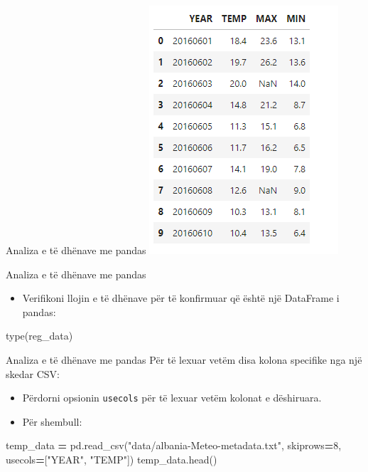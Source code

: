 \documentclass[
  ignorenonframetext,
]{beamer}
\newenvironment{Shaded}{\begin{snugshade}}{\end{snugshade}}
\newcommand{\BuiltInTok}[1]{#1}
\newcommand{\DecValTok}[1]{\textcolor[rgb]{0.00,0.00,0.81}{#1}}
\newcommand{\NormalTok}[1]{#1}
\newcommand{\OperatorTok}[1]{\textcolor[rgb]{0.81,0.36,0.00}{\textbf{#1}}}
\newcommand{\StringTok}[1]{\textcolor[rgb]{0.31,0.60,0.02}{#1}}
\providecommand{\tightlist}{%
  \setlength{\itemsep}{0pt}\setlength{\parskip}{0pt}}
\begin{document}
\begin{frame}{Analiza e të dhënave me pandas}
\protect\hypertarget{analiza-e-tuxeb-dhuxebnave-me-pandas-3}{}
\includegraphics{./Figs/panda4.png}
\end{frame}

\begin{frame}[fragile]{Analiza e të dhënave me pandas}
\protect\hypertarget{analiza-e-tuxeb-dhuxebnave-me-pandas-4}{}
\begin{itemize}
\tightlist
\item
  Verifikoni llojin e të dhënave për të konfirmuar që është një
  DataFrame i pandas:
\end{itemize}

\begin{Shaded}
\begin{Highlighting}[]
    \BuiltInTok{type}\NormalTok{(reg\_data)}
\end{Highlighting}
\end{Shaded}
\end{frame}

\begin{frame}[fragile]{Analiza e të dhënave me pandas}
\protect\hypertarget{analiza-e-tuxeb-dhuxebnave-me-pandas-5}{}
Për të lexuar vetëm disa kolona specifike nga një skedar CSV:

\begin{itemize}
\item
  Përdorni opsionin \texttt{usecols} për të lexuar vetëm kolonat e
  dëshiruara.
\item
  Për shembull:
\end{itemize}

\begin{Shaded}
\begin{Highlighting}[]
\NormalTok{temp\_data }\OperatorTok{=}\NormalTok{ pd.read\_csv(}\StringTok{"data/albania{-}Meteo{-}metadata.txt"}\NormalTok{, skiprows}\OperatorTok{=}\DecValTok{8}\NormalTok{, usecols}\OperatorTok{=}\NormalTok{[}\StringTok{"YEAR"}\NormalTok{, }\StringTok{"TEMP"}\NormalTok{])}
\NormalTok{temp\_data.head()}
\end{Highlighting}
\end{Shaded}
\end{frame}
\end{document}
